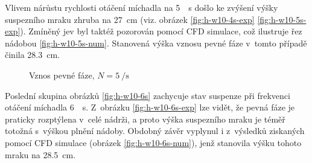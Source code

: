Vlivem nárůstu rychlosti otáčení míchadla na \SI{5}{\per\second} došlo ke zvýšení výšky suspezního mraku zhruba na \SI{27}{\centi\meter} (viz. obrázek \ref{fig:h-w10-4s-exp} \ref{fig:h-w10-5s-exp}). Zmíněný jev byl taktéž pozorován pomocí CFD simulace, což ilustruje řez nádobou \ref{fig:h-w10-5s-num}. Stanovená výška vznosu pevné fáze v~tomto případě činila \SI{28.3}{\centi\meter}. 
\newpage

\begin{figure}[t!]
 \centering
  \qquad 
  \caption{Vznos pevné fáze, $N=\SI{5}{\per\second}$}
  \label{fig:h-w10-5s}
\end{figure}
Poslední skupina obrázků \ref{fig:h-w10-6s} zachycuje stav suspenze při frekvenci otáčení míchadla \SI{6}{\per\second}. Z~obrázku \ref{fig:h-w10-6s-exp} lze vidět, že pevná fáze je praticky rozptýlena v~celé nádrži, a proto výška suspezního mraku je téměř totožná s~výškou plnění nádoby. Obdobný závěr vyplynul i z~výsledků ziskaných pomocí CFD simulace (obrázek \ref{fig:h-w10-6s-num}), jenž stanovila výšku tohoto mraku na \SI{28.5}{\centi\meter}.

